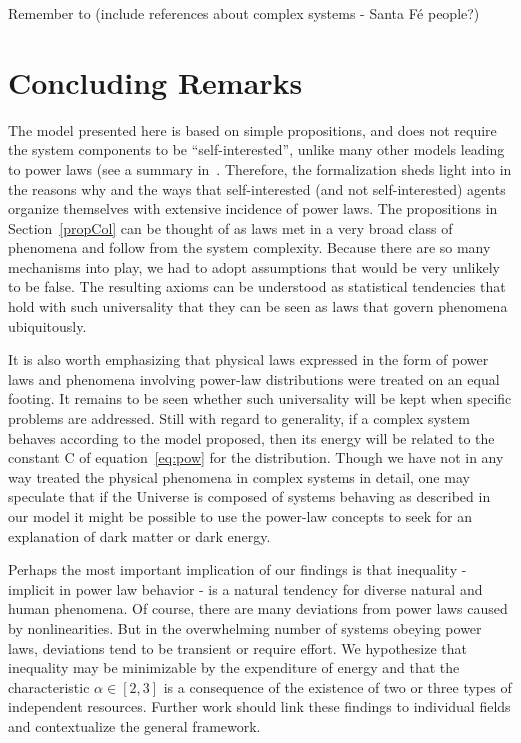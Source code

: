 \documentclass[a4paper, 11pt]{article} %
\begin{document}
Remember to (include references about complex systems - Santa Fé people?)

\section{Concluding Remarks}

The model presented here is based on simple propositions, and does not require the system components to be ``self-interested'',
unlike many other models leading to power laws (see a summary in~\cite{newmanpower,part}. Therefore, the formalization sheds light into in the reasons why and the ways that self-interested (and not self-interested) agents organize themselves with extensive incidence of power laws. The propositions in Section~\ref{propCol} can be thought of as laws met in a very broad class of phenomena and follow from the system complexity. Because there are so many mechanisms into play, we had to adopt assumptions that would be very unlikely to be false. The resulting axioms can be understood as statistical tendencies that hold with such universality that they can be seen as laws that govern phenomena ubiquitously. 

It is also worth emphasizing that physical laws expressed in the form of power laws and phenomena involving power-law distributions were treated on an equal footing. It remains to be seen whether such universality will be kept when specific problems are addressed. Still with regard to generality, if a complex system behaves according to the model proposed, then its energy will be related to the constant C of equation~\ref{eq:pow} for the distribution. Though we have not in any way treated the physical phenomena in complex systems in detail, one may speculate that if the Universe is composed of systems behaving as described in our model it might be possible to use the power-law concepts to seek for an explanation of dark matter or dark energy. 

Perhaps the most important implication of our findings is that inequality - implicit in power law behavior - is a natural tendency for diverse natural and human phenomena. Of course, there are many deviations from power laws caused by nonlinearities. But in the overwhelming number of systems obeying power laws, deviations tend to be transient or require effort. We hypothesize that inequality may be minimizable by the expenditure of energy and that the characteristic $\alpha \in [2,3]$ is a consequence of the existence of two or three types of independent resources. Further work should link these findings to individual fields and contextualize the general framework.
\end{document}
